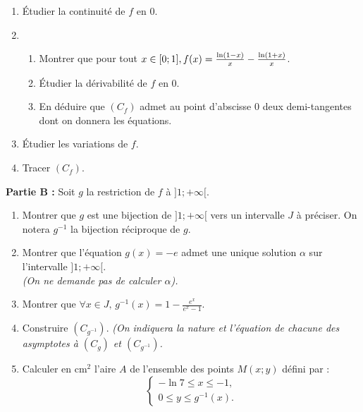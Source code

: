 \documentclass[12pt,a4paper]{article}
\begin{document}
\begin{multicols}{2}
\begin{enumerate}
    \item Étudier la continuité de \( f \) en \( 0 \).
    \item 
    \begin{enumerate}
        \item Montrer que pour tout \( x \in [0; 1],\\ f(x) = \frac{\ln(1 - x)}{x} - \frac{\ln(1 + x)}{x} \).
        \item Étudier la dérivabilité de \( f \) en \( 0 \).
        \item En déduire que \( (C_f) \) admet au point d’abscisse \( 0 \) deux demi-tangentes dont on donnera les équations.
    \end{enumerate}
    \item Étudier les variations de \( f \).
    \item Tracer \( (C_f) \).
\end{enumerate}
    \textbf{Partie B :} Soit \( g \) la restriction de \( f \) à \( ]1; +\infty[ \).
\begin{enumerate}
    \item Montrer que \( g \) est une bijection de \( ]1; +\infty[ \) vers un intervalle \( J \) à préciser. On notera \( g^{-1} \) la bijection réciproque de \( g \).
    \item Montrer que l’équation \( g(x) = -e \) admet une unique solution \( \alpha \) sur l’intervalle \( ]1; +\infty[ \). \\
    \textit{(On ne demande pas de calculer \( \alpha \)).}
    \item Montrer que \( \forall x \in J, \, g^{-1}(x) = 1 - \frac{e^x}{e^x - 1}. \)
    \item Construire \( (C_{g^{-1}}) \). \textit{(On indiquera la nature et l’équation de chacune des asymptotes à \( (C_g) \) et \( (C_{g^{-1}}) \).}
    \item Calculer en \( \text{cm}^2 \) l’aire \( A \) de l’ensemble des points \( M(x; y) \) défini par :
\[
\left\{
\begin{array}{ll}
    -\ln 7 \leq x \leq -1, \\
    0 \leq y \leq g^{-1}(x).
\end{array}
\right.
\]
\end{enumerate}
\end{multicols}
\end{document}
